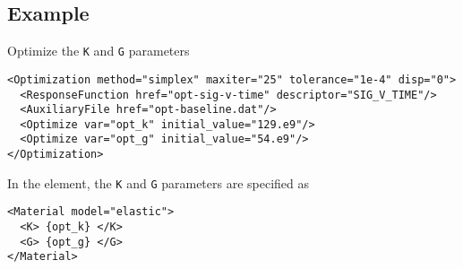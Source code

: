 \documentclass[11pt]{report}
\newcommand{\reqdtag}[1]{\Red{\texttt{<#1>}}}
\begin{document}
\subsection{Example}
Optimize the \texttt{K} and \texttt{G} parameters
\begin{verbatim}
<Optimization method="simplex" maxiter="25" tolerance="1e-4" disp="0">
  <ResponseFunction href="opt-sig-v-time" descriptor="SIG_V_TIME"/>
  <AuxiliaryFile href="opt-baseline.dat"/>
  <Optimize var="opt_k" initial_value="129.e9"/>
  <Optimize var="opt_g" initial_value="54.e9"/>
</Optimization>
\end{verbatim}

In the \reqdtag{Material} element, the \texttt{K} and \texttt{G} parameters
are specified as
%
\begin{verbatim}
<Material model="elastic">
  <K> {opt_k} </K>
  <G> {opt_g} </G>
</Material>
\end{verbatim}
\end{document}
